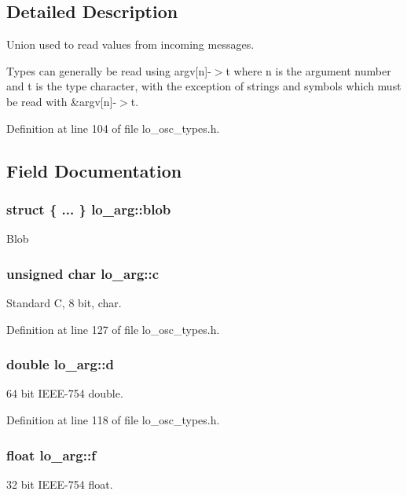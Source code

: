 \subsection{Detailed Description}
Union used to read values from incoming messages. 

Types can generally be read using argv\mbox{[}n\mbox{]}-\/$>$t where n is the argument number and t is the type character, with the exception of strings and symbols which must be read with \&argv\mbox{[}n\mbox{]}-\/$>$t. 

Definition at line 104 of file lo\+\_\+osc\+\_\+types.\+h.



\subsection{Field Documentation}
\hypertarget{unionlo__arg_a1b9b898eeee0ed6c475fc1e0d311d020}{
\subsubsection[{blob}]{\setlength{\rightskip}{0pt plus 5cm}struct \{ ... \}   lo\+\_\+arg\+::blob}}\label{unionlo__arg_a1b9b898eeee0ed6c475fc1e0d311d020}
Blob \hypertarget{unionlo__arg_aa2e1c99864cf46e6b9cc52fb5cb214fe}{
\subsubsection[{c}]{\setlength{\rightskip}{0pt plus 5cm}unsigned char lo\+\_\+arg\+::c}}\label{unionlo__arg_aa2e1c99864cf46e6b9cc52fb5cb214fe}
Standard C, 8 bit, char. 

Definition at line 127 of file lo\+\_\+osc\+\_\+types.\+h.

\hypertarget{unionlo__arg_a2a690890222baa5b9971f8772cb02535}{
\subsubsection[{d}]{\setlength{\rightskip}{0pt plus 5cm}double lo\+\_\+arg\+::d}}\label{unionlo__arg_a2a690890222baa5b9971f8772cb02535}
64 bit I\+E\+E\+E-\/754 double. 

Definition at line 118 of file lo\+\_\+osc\+\_\+types.\+h.

\hypertarget{unionlo__arg_ad61c0f83abb077ce656b3a39d5c7e19f}{
\subsubsection[{f}]{\setlength{\rightskip}{0pt plus 5cm}float lo\+\_\+arg\+::f}}\label{unionlo__arg_ad61c0f83abb077ce656b3a39d5c7e19f}
32 bit I\+E\+E\+E-\/754 float. 

